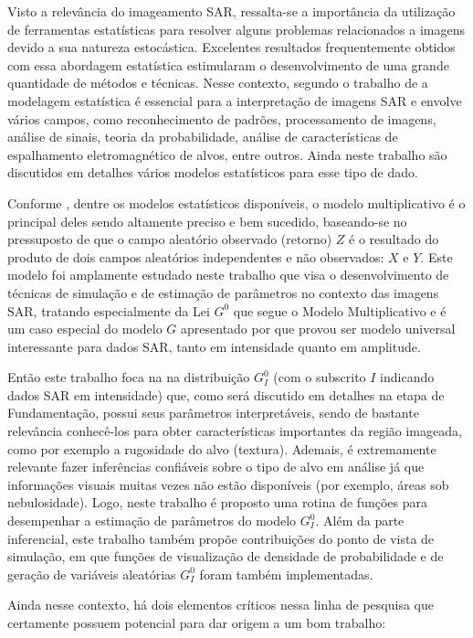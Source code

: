 Visto a relevância do imageamento SAR, ressalta-se a importância da utilização de ferramentas estatísticas para resolver alguns problemas relacionados a imagens devido a sua natureza estocástica. Excelentes resultados frequentemente obtidos com essa abordagem estatística estimularam o desenvolvimento de uma grande quantidade de métodos e técnicas. Nesse contexto, segundo o trabalho de \citet{Gao2010StatisticalMO} a modelagem estatística é essencial para a interpretação de imagens SAR e envolve vários campos, como reconhecimento de padrões, processamento de imagens, análise de sinais, teoria da probabilidade, análise de características de espalhamento eletromagnético de alvos, entre outros. Ainda neste trabalho são discutidos em detalhes vários modelos estatísticos para esse tipo de dado.

Conforme \citet{Mejail2002}, dentre os modelos estatísticos disponíveis, o modelo multiplicativo é o principal deles sendo altamente preciso e bem sucedido, baseando-se no pressuposto de que o campo aleatório observado (retorno) $Z$ é o resultado do produto de dois campos aleatórios independentes e não observados: $X$ e $Y$. Este modelo foi amplamente estudado neste trabalho que visa o desenvolvimento de técnicas de simulação e de estimação de parâmetros no contexto das imagens SAR, tratando especialmente da Lei $G^{0}$ que segue o Modelo Multiplicativo e é um caso especial do modelo $G$ apresentado por \citet{Clutter1997} que provou ser modelo universal interessante para dados SAR, tanto em intensidade quanto em amplitude.

Então este trabalho foca na na distribuição $G_I^0$ (com o subscrito $I$ indicando dados SAR em intensidade) que, como será discutido em detalhes na etapa de Fundamentação, possui seus parâmetros interpretáveis, sendo de bastante relevância conhecê-los para obter características importantes da região imageada, como por exemplo a rugosidade do alvo (textura). Ademais, é extremamente relevante fazer inferências confiáveis sobre o tipo de alvo em análise já que informações visuais muitas vezes não estão disponíveis (por exemplo, áreas sob nebulosidade). Logo, neste trabalho é proposto uma rotina de funções para desempenhar a estimação de parâmetros do modelo $G_I^0$. Além da parte inferencial, este trabalho também propõe contribuições do ponto de vista de simulação, em que funções de visualização de densidade de probabilidade e de geração de variáveis aleatórias $G_I^0$ foram também implementadas. 

Ainda nesse contexto, há dois elementos críticos nessa linha de pesquisa que certamente possuem potencial para dar origem a um bom trabalho:

